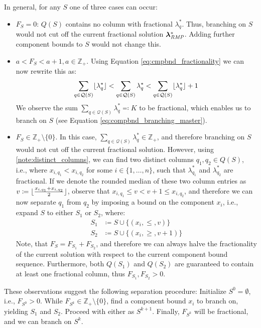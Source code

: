 In general, for any $S$ one of three cases can occur:
\begin{itemize}
\item	$F_S = 0$: $Q(S)$ contains no column with fractional $\lambda_q^*$. Thus, branching on $S$ would not cut off the current fractional solution ${\bm{\lambda}}^*_{\textit{RMP}}{}$. Adding further component bounds to $S$ would not change this.
\item	$a < F_S < a + 1, a \in \mathbb{Z}_+$. Using Equation \eqref{eq:cmpbnd_fractionality} we can now rewrite this as:
		\begin{equation}
		\sum_{q \in \mathcal{Q}(S)} \lfloor\lambda_q^*\rfloor < \sum_{q \in \mathcal{Q}(S)} \lambda_q^* < \sum_{q \in \mathcal{Q}(S)} \lfloor\lambda_q^*\rfloor + 1
		\end{equation}
		We observe the sum $\sum_{q \in \mathcal{Q}(S)} \lambda_q^* \eqcolon K$ to be fractional, which enables us to branch on $S$ (see Equation \eqref{eq:compbnd_branching_master}).
\item	$F_S \in \mathbb{Z}_+ \setminus \{0\}$. In this case, $\sum_{q \in \mathcal{Q}(S)} \lambda_q^* \in \mathbb{Z}_+$, and therefore branching on $S$ would not cut off the current fractional solution. However, using \ref{note:distinct_columns}, we can find two distinct columns $q_1, q_2 \in Q(S)$, i.e., where $x_{i,q_1} < x_{i,q_2}$ for some $i \in \{1, \dots, n\}$, such that $\lambda_{q_1}^*$ and $\lambda_{q_2}^*$ are fractional. If we denote the rounded median of these two column entries as $v \coloneqq \lfloor\frac{x_{i,q_1} + x_{i,q_2}}{2}\rfloor$, observe that $x_{i,q_1} \leq v < v + 1 \leq x_{i,q_2}$, and therefore we can now separate $q_1$ from $q_2$ by imposing a bound on the component $x_i$, i.e., expand $S$ to either $S_1$ or $S_2$, where:
		\begin{equation}
		\begin{aligned}
		S_1 &\coloneqq S \cup \{\left( x_i, \leq, v \right)\}\\
		S_2 &\coloneqq S \cup \{\left( x_i, \geq, v + 1 \right)\}
		\end{aligned}
		\end{equation}
		Note, that $F_S = F_{S_1} + F_{S_2}$, and therefore we can always halve the fractionality of the current solution with respect to the current component bound sequence. Furthermore, both $Q(S_1)$ and $Q(S_2)$ are guaranteed to contain at least one fractional column, thus $F_{S_1}, F_{S_2} > 0$.
\end{itemize}

These observations suggest the following separation procedure: Initialize $S^0 = \emptyset$, i.e., $F_{S^0} > 0$. While $F_{S^k} \in \mathbb{Z}_+ \setminus \{0\}$, find a component bound $x_i$ to branch on, yielding $S_1$ and $S_2$. Proceed with either as $S^{k+1}$. Finally, $F_{S^k}$ will be fractional, and we can branch on $S^k$.

